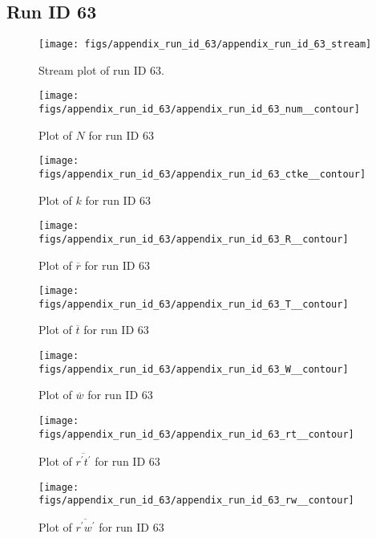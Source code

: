 \subsection{Run ID 63}
\begin{figure}[H]
\centering
\texttt{[image: figs/appendix\_run\_id\_63/appendix\_run\_id\_63\_stream]}
\caption{Stream plot of run ID 63.}
\label{fig:appendix_run_id_63_stream}
\end{figure}


\begin{figure}[H]
\centering
\texttt{[image: figs/appendix\_run\_id\_63/appendix\_run\_id\_63\_num\_\_contour]}
\caption{Plot of $N$ for run ID 63}
\label{fig:appendix_run_id_63_num__contour}
\end{figure}


\begin{figure}[H]
\centering
\texttt{[image: figs/appendix\_run\_id\_63/appendix\_run\_id\_63\_ctke\_\_contour]}
\caption{Plot of $k$ for run ID 63}
\label{fig:appendix_run_id_63_ctke__contour}
\end{figure}


\begin{figure}[H]
\centering
\texttt{[image: figs/appendix\_run\_id\_63/appendix\_run\_id\_63\_R\_\_contour]}
\caption{Plot of $\overline{r}$ for run ID 63}
\label{fig:appendix_run_id_63_R__contour}
\end{figure}


\begin{figure}[H]
\centering
\texttt{[image: figs/appendix\_run\_id\_63/appendix\_run\_id\_63\_T\_\_contour]}
\caption{Plot of $\overline{t}$ for run ID 63}
\label{fig:appendix_run_id_63_T__contour}
\end{figure}


\begin{figure}[H]
\centering
\texttt{[image: figs/appendix\_run\_id\_63/appendix\_run\_id\_63\_W\_\_contour]}
\caption{Plot of $\overline{w}$ for run ID 63}
\label{fig:appendix_run_id_63_W__contour}
\end{figure}


\begin{figure}[H]
\centering
\texttt{[image: figs/appendix\_run\_id\_63/appendix\_run\_id\_63\_rt\_\_contour]}
\caption{Plot of $\overline{r^\prime t^\prime}$ for run ID 63}
\label{fig:appendix_run_id_63_rt__contour}
\end{figure}


\begin{figure}[H]
\centering
\texttt{[image: figs/appendix\_run\_id\_63/appendix\_run\_id\_63\_rw\_\_contour]}
\caption{Plot of $\overline{r^\prime w^\prime}$ for run ID 63}
\label{fig:appendix_run_id_63_rw__contour}
\end{figure}



